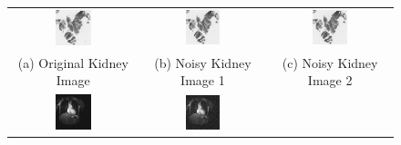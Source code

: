 \documentclass[a4paper,12pt]{article}
\begin{document}
\begin{figure}[hbtp]
    \begin{tabular}{ccc}
        \includegraphics[width=0.3\textwidth]{data/input/Kidney1-Crop.png} &
        \includegraphics[width=0.3\textwidth]{data/input/Kidney1-Crop-Noise1.png} &
        \includegraphics[width=0.3\textwidth]{data/input/Kidney1-Crop-Noise2.png} \\
        (a) Original Kidney Image & (b) Noisy Kidney Image 1 & (c) Noisy Kidney Image 2 \\
        \includegraphics[width=0.3\textwidth]{data/input/Thorax.png} &
        \includegraphics[width=0.3\textwidth]{data/input/Thorax-Noise1.png} &

\end{tabular}
\end{figure}
\end{document}
